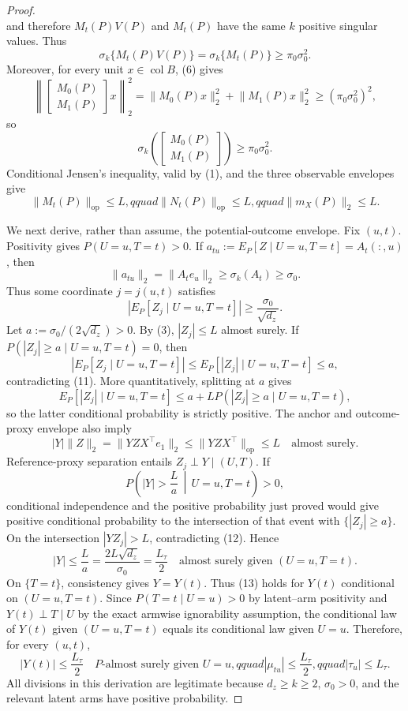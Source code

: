 \documentclass{article}
\begin{document}
\begin{proof}
\[\]
and therefore \(M_t(P)V(P)\) and \(M_t(P)\) have the same \(k\) positive singular values.  Thus
\[
\sigma_k\{M_t(P)V(P)\}=\sigma_k\{M_t(P)\}\ge\pi_0\sigma_0^2.              \tag{8}
\]
Moreover, for every unit \(x\in\operatorname{col}B\), (6) gives
\[
\left\lVert\begin{bmatrix}M_0(P)\\M_1(P)\end{bmatrix}x\right\rVert_2^2
=\lVert M_0(P)x\rVert_2^2+\lVert M_1(P)x\rVert_2^2
\ge(\pi_0\sigma_0^2)^2,
\]
so
\[
\sigma_k\!\left(\begin{bmatrix}M_0(P)\\M_1(P)\end{bmatrix}\right)
\ge\pi_0\sigma_0^2.                                                           \tag{9}
\]
Conditional Jensen's inequality, valid by (1), and the three observable envelopes give
\[
\lVert M_t(P)\rVert_{\mathrm{op}}\le L,qquad
\lVert N_t(P)\rVert_{\mathrm{op}}\le L,qquad
\lVert m_X(P)\rVert_2\le L.                                                    \tag{10}
\]

We next derive, rather than assume, the potential-outcome envelope.  Fix \((u,t)\).  Positivity gives \(P(U=u,T=t)>0\).  If \(a_{tu}:=E_P[Z\mid U=u,T=t]=A_t(:,u)\), then
\[
\lVert a_{tu}\rVert_2=\lVert A_te_u\rVert_2\ge\sigma_k(A_t)\ge\sigma_0.
\]
Thus some coordinate \(j=j(u,t)\) satisfies
\[
|E_P[Z_j\mid U=u,T=t]|\ge\frac{\sigma_0}{\sqrt{d_z}}.                         \tag{11}
\]
Let \(a:=\sigma_0/(2\sqrt{d_z})>0\).  By (3), \(|Z_j|\le L\) almost surely.  If
\(P(|Z_j|\ge a\mid U=u,T=t)=0\), then
\[
|E_P[Z_j\mid U=u,T=t]|\le E_P[|Z_j|\mid U=u,T=t]\le a,
\]
contradicting (11).  More quantitatively, splitting at \(a\) gives
\[
E_P[|Z_j|\mid U=u,T=t]\le a+L P(|Z_j|\ge a\mid U=u,T=t),
\]
so the latter conditional probability is strictly positive.  The anchor and outcome-proxy envelope also imply
\[
|Y|\lVert Z\rVert_2
=\lVert YZX^\top e_1\rVert_2
\le\lVert YZX^\top\rVert_{\mathrm{op}}\le L\quad\text{almost surely}.          \tag{12}
\]
Reference-proxy separation entails \(Z_j\perp Y\mid(U,T)\).  If
\[
P\!\left(|Y|>\frac{L}{a}\,\middle|\,U=u,T=t\right)>0,
\]
conditional independence and the positive probability just proved would give positive conditional probability to the intersection of that event with \(\{|Z_j|\ge a\}\).  On the intersection \(|YZ_j|>L\), contradicting (12).  Hence
\[
|Y|\le\frac{L}{a}=\frac{2L\sqrt{d_z}}{\sigma_0}=\frac{L_{\tau}}2
\quad\text{almost surely given }(U=u,T=t).                                    \tag{13}
\]
On \(\{T=t\}\), consistency gives \(Y=Y(t)\).  Thus (13) holds for \(Y(t)\) conditional on \((U=u,T=t)\).  Since
\(P(T=t\mid U=u)>0\) by latent--arm positivity and \(Y(t)\perp T\mid U\) by the exact armwise ignorability assumption, the conditional law of \(Y(t)\) given \((U=u,T=t)\) equals its conditional law given \(U=u\).  Therefore, for every \((u,t)\),
\[
|Y(t)|\le\frac{L_{\tau}}2\quad P\text{-almost surely given }U=u,qquad
|\mu_{tu}|\le\frac{L_{\tau}}2,qquad |\tau_u|\le L_{\tau}.                  \tag{14}
\]
All divisions in this derivation are legitimate because \(d_z\ge k\ge2\), \(\sigma_0>0\), and the relevant latent arms have positive probability.


\end{proof}
\end{document}
